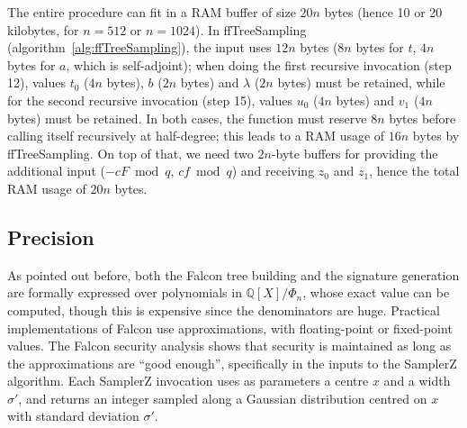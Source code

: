 \documentclass{llncs}
\newcommand{\bQ}{\mathbb{Q}}
\begin{document}
The entire procedure can fit in a RAM buffer of size $20n$ bytes (hence
10 or 20 kilobytes, for $n = 512$ or $n = 1024$). In
\textsf{ffTreeSampling} (algorithm~\ref{alg:ffTreeSampling}), the input
uses $12n$ bytes ($8n$ bytes for $t$, $4n$ bytes for $a$, which is
self-adjoint); when doing the first recursive invocation (step 12),
values $t_0$ ($4n$ bytes), $b$ ($2n$ bytes) and $\lambda$ ($2n$ bytes)
must be retained, while for the second recursive invocation (step 15),
values $u_0$ ($4n$ bytes) and $v_1$ ($4n$ bytes) must be retained. In
both cases, the function must reserve $8n$ bytes before calling itself
recursively at half-degree; this leads to a RAM usage of $16n$ bytes by
\textsf{ffTreeSampling}. On top of that, we need two $2n$-byte buffers
for providing the additional input ($-cF \bmod q$, $cf \bmod q$) and
receiving $z_0$ and $z_1$, hence the total RAM usage of $20n$ bytes.

\subsection{Precision}\label{sec:precision}

As pointed out before, both the Falcon tree building and the signature
generation are formally expressed over polynomials in $\bQ[X]/\Phi_n$,
whose exact value can be computed, though this is expensive since the
denominators are huge. Practical implementations of Falcon use
approximations, with floating-point or fixed-point values. The Falcon
security analysis shows that security is maintained as long as the
approximations are ``good enough'', specifically in the inputs to the
\textsf{SamplerZ} algorithm. Each \textsf{SamplerZ} invocation uses as
parameters a centre $x$ and a width $\sigma'$, and returns an integer
sampled along a Gaussian distribution centred on $x$ with standard
deviation $\sigma'$.
\end{document}
